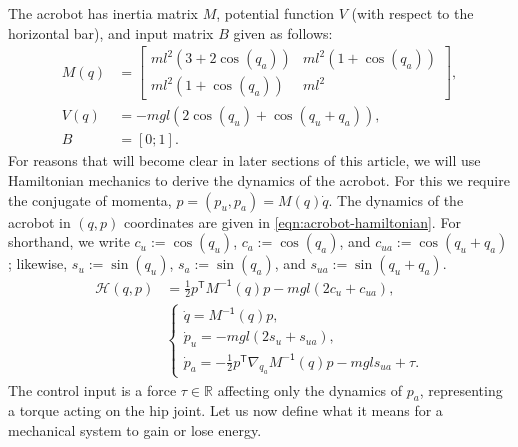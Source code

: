 \documentclass[journal,twoside,web]{ieeecolor}
\newcommand*{\tpose}{^\mathsf{T}}
\newcommand*{\R}{\mathbb{R}}
\newcommand*{\Minv}{M^\mathsf{-1}}
\begin{document}

The acrobot has inertia matrix 
\(M\), potential function \(V\) (with respect to
the horizontal bar), and input matrix \(B\) given as follows:
\begin{align}\label{eqn:acrobot-inertia}
    M(q) &= \begin{bmatrix}
        ml^2\left(3+2\cos(q_a)\right) & 
        ml^2\left(1+\cos(q_a)\right) \\
        ml^2\left(1+\cos(q_a)\right) &
        ml^2
    \end{bmatrix} 
    , \\
    \label{eqn:acrobot-potential}
    V(q) &= -mgl\left(2\cos(q_u)+\cos(q_u+q_a)\right)
    , \\
    \label{eqn:acrobot-B}
    B &= [0;1]
    .
\end{align}
For reasons that will become clear in later sections of this article, we will
use Hamiltonian mechanics to derive the dynamics of the acrobot. 
For this we require the conjugate of momenta, \(p = (p_u,p_a) = M(q)\dot{q}\).
The dynamics of the acrobot in \((q,p)\) coordinates are given in
\eqref{eqn:acrobot-hamiltonian}.
For shorthand, we write \(c_u := \cos(q_u)\), \(c_a := \cos(q_a)\), and 
\(c_{ua} := \cos(q_u + q_a)\); likewise, \(s_u := \sin(q_u)\), 
\(s_a := \sin(q_a)\), and \(s_{ua} := \sin(q_u + q_a)\).
\begin{align}\label{eqn:acrobot-hamiltonian}
    \mathcal{H}(q,p) &= \frac{1}{2}p\tpose \Minv(q) p -
    mgl\left(2 c_u + c_{ua}\right)
    , \\
     &\begin{cases}
        \dot{q} = \Minv(q) p 
        ,\\
        \dot{p}_u = -mgl\left(2s_u + s_{ua}\right) 
        ,\\
        \dot{p}_a =-\frac{1}{2}p\tpose \nabla_{q_a}\Minv(q) p
        - mgl s_{ua} + \tau.
    \end{cases} \nonumber
\end{align}
The control input is a force \(\tau \in \R\) affecting only the dynamics of
\(p_a\), representing a torque acting on the hip joint.
Let us now define what it means for a mechanical system to gain or lose energy.
\end{document}
